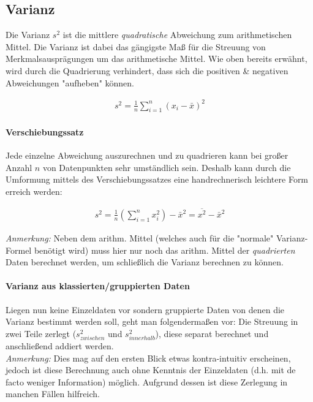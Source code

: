 \documentclass[a4paper]{article}
\begin{document}
\noindent {}

\subsection{Varianz}\label{sec:varianz}
Die Varianz $s^2$ ist die mittlere \textit{quadratische} Abweichung zum arithmetischen Mittel. Die Varianz ist dabei das gängigste Maß für die Streuung von Merkmalsausprägungen um das arithmetische Mittel. Wie oben bereits erwähnt, wird durch die Quadrierung verhindert, dass sich die positiven \& negativen Abweichungen "aufheben" können.

\begin{align*}
    s^2 = \frac{1}{n} \sum_{i=1}^n (x_i-\bar{x})^2
\end{align*}

\paragraph{Verschiebungssatz} Jede einzelne Abweichung auszurechnen und zu quadrieren kann bei großer Anzahl $n$ von Datenpunkten sehr umständlich sein. Deshalb kann durch die Umformung mittels des Verschiebungssatzes eine handrechnerisch leichtere Form erreich werden:

\begin{align*}
    s^2 = \frac{1}{n} (\sum_{i=1}^n x^2_i)-\bar{x}^2 = \overline{x^2} - \bar{x}^2
\end{align*}

\noindent \textit{Anmerkung:} Neben dem arithm. Mittel (welches auch für die "normale" Varianz-Formel benötigt wird) muss hier nur noch das arithm. Mittel der \textit{quadrierten} Daten berechnet werden, um schließlich die Varianz berechnen zu können.

\paragraph{Varianz aus klassierten/gruppierten Daten} Liegen nun keine Einzeldaten vor sondern gruppierte Daten von denen die Varianz bestimmt werden soll, geht man folgendermaßen vor:
Die Streuung in zwei Teile zerlegt ($s^2_{zwischen}$ und $s^2_{innerhalb}$), diese separat berechnet und anschließend addiert werden.\\
\textit{Anmerkung:} Dies mag auf den ersten Blick etwas kontra-intuitiv erscheinen, jedoch ist diese Berechnung auch ohne Kenntnis der Einzeldaten (d.h. mit de facto weniger Information) möglich. Aufgrund dessen ist diese Zerlegung in manchen Fällen hilfreich.\\
\end{document}

